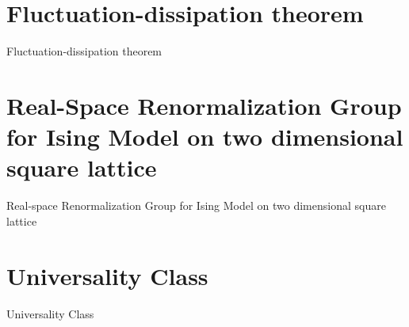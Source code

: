 \documentclass[%
 reprint,
 amsmath,amssymb,
 aps,
]{revtex4-2}
\begin{document}
\appendix

\section{\label{appx:fluc}Fluctuation-dissipation theorem}
Fluctuation-dissipation theorem

\section{\label{appx:rsrg-ising}Real-Space Renormalization Group for Ising Model on 
two dimensional square lattice}
Real-space Renormalization Group for Ising Model on two dimensional square lattice

\section{\label{appx:universal}Universality Class}
Universality Class


% 
\end{document}
